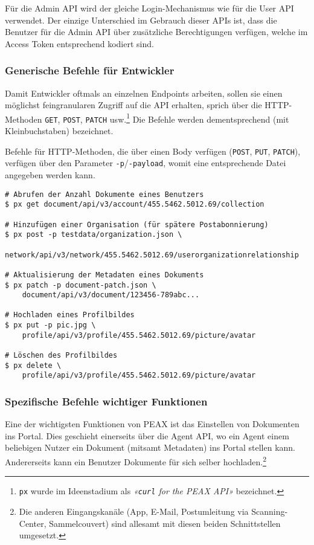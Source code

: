 Für die Admin API wird der gleiche Login-Mechanismus wie für die User API verwendet. Der einzige Unterschied im Gebrauch dieser APIs ist, dass die Benutzer für die Admin API über zusätzliche Berechtigungen verfügen, welche im Access Token entsprechend kodiert sind.

\subsubsection{Generische Befehle für Entwickler}

Damit Entwickler oftmals an einzelnen Endpoints arbeiten, sollen sie einen möglichst feingranularen Zugriff auf die API erhalten, sprich über die HTTP-Methoden \texttt{GET}, \texttt{POST}, \texttt{PATCH} usw.\footnote{\texttt{px} wurde im Ideenstadium als \textit{«\texttt{curl} for the PEAX API»} bezeichnet.} Die Befehle werden dementsprechend (mit Kleinbuchstaben) bezeichnet.

Befehle für HTTP-Methoden, die über einen Body verfügen (\texttt{POST}, \texttt{PUT}, \texttt{PATCH}), verfügen über den Parameter \texttt{-p}/\texttt{-payload}, womit eine entsprechende Datei angegeben werden kann.

\begin{lstlisting}[caption={Anwendung der feingranularen HTTP-Befehle}]
# Abrufen der Anzahl Dokumente eines Benutzers
$ px get document/api/v3/account/455.5462.5012.69/collection

# Hinzufügen einer Organisation (für spätere Postabonnierung)
$ px post -p testdata/organization.json \
    network/api/v3/network/455.5462.5012.69/userorganizationrelationship

# Aktualisierung der Metadaten eines Dokuments
$ px patch -p document-patch.json \
    document/api/v3/document/123456-789abc...

# Hochladen eines Profilbildes
$ px put -p pic.jpg \
    profile/api/v3/profile/455.5462.5012.69/picture/avatar

# Löschen des Profilbildes
$ px delete \
    profile/api/v3/profile/455.5462.5012.69/picture/avatar
\end{lstlisting}

\subsubsection{Spezifische Befehle wichtiger Funktionen}

Eine der wichtigsten Funktionen von PEAX ist das Einstellen von Dokumenten ins Portal. Dies geschieht einerseits über die Agent API, wo ein Agent einem beliebigen Nutzer ein Dokument (mitsamt Metadaten) ins Portal stellen kann. Andererseits kann ein Benutzer Dokumente für sich selber hochladen.\footnote{Die anderen Eingangskanäle (App, E-Mail, Postumleitung via Scanning-Center, Sammelcouvert) sind allesamt mit diesen beiden Schnittstellen umgesetzt.}

